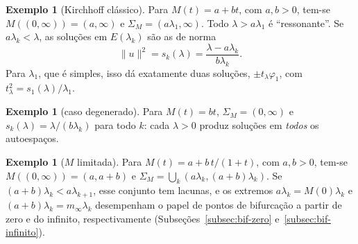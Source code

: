 \documentclass[11pt,a4paper]{article}
\theoremstyle{plain}
\theoremstyle{definition}
\newtheorem{exemplo}[teorema]{Exemplo}
\theoremstyle{remark}
\newcommand{\norm}[1]{\lVert #1\rVert}
\begin{document}
\begin{exemplo}[Kirchhoff clássico]\label{ex:classico}
Para $M(t)=a+bt$, com $a,b>0$, tem-se $M((0,\infty))=(a,\infty)$ e
$\Sigma_M=(a\lambda_1,\infty)$. Todo $\lambda>a\lambda_1$ é ``ressonante''. Se
$a\lambda_k<\lambda$, as soluções em $E(\lambda_k)$ são as de norma
\[
\norm{u}^2=s_k(\lambda)=\frac{\lambda-a\lambda_k}{b\lambda_k}.
\]
Para $\lambda_1$, que é simples, isso dá exatamente duas soluções,
$\pm t_\lambda\varphi_1$, com $t_\lambda^2=s_1(\lambda)/\lambda_1$.
\end{exemplo}

\begin{exemplo}[caso degenerado]\label{ex:degenerado}
Para $M(t)=bt$, $\Sigma_M=(0,\infty)$ e
$s_k(\lambda)=\lambda/(b\lambda_k)$ para todo $k$: cada $\lambda>0$ produz
soluções em \emph{todos} os autoespaços.
\end{exemplo}

\begin{exemplo}[$M$ limitada]\label{ex:limitada}
Para $M(t)=a+b\,t/(1+t)$, com $a,b>0$, tem-se $M((0,\infty))=(a,a+b)$ e
$\Sigma_M=\bigcup_k(a\lambda_k,(a+b)\lambda_k)$. Se $(a+b)\lambda_k<a\lambda_{k+1}$,
esse conjunto tem lacunas, e os extremos $a\lambda_k=M(0)\lambda_k$ e
$(a+b)\lambda_k=m_\infty\lambda_k$ desempenham o papel de pontos de bifurcação
a partir de zero e do infinito, respectivamente
(Subseções~\ref{subsec:bif-zero} e~\ref{subsec:bif-infinito}).
\end{exemplo}
\end{document}
